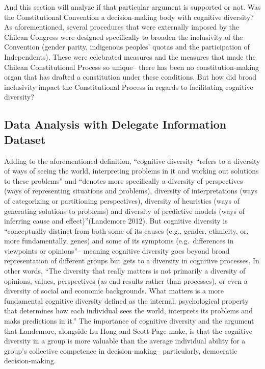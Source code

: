 \documentclass[
]{article}
\begin{document}
And this section will analyze if that particular argument is supported
or not. Was the Constitutional Convention a decision-making body with
cognitive diversity? As aforementioned, several procedures that were
externally imposed by the Chilean Congress were designed specifically to
broaden the inclusivity of the Convention (gender parity, indigenous
peoples' quotas and the participation of Independents). These were
celebrated measures and the measures that made the Chilean
Constitutional Process so unique-- there has been no constitution-making
organ that has drafted a constitution under these conditions. But how
did broad inclusivity impact the Constitutional Process in regards to
facilitating cognitive diversity?

\hypertarget{data-analysis-with-delegate-information-dataset}{%
\subsection{Data Analysis with Delegate Information
Dataset}\label{data-analysis-with-delegate-information-dataset}}

Adding to the aforementioned definition, ``cognitive diversity ``refers
to a diversity of ways of seeing the world, interpreting problems in it
and working out solutions to these problems'' and ``denotes more
specifically a diversity of perspectives (ways of representing
situations and problems), diversity of interpretations (ways of
categorizing or partitioning perspectives), diversity of heuristics
(ways of generating solutions to problems) and diversity of predictive
models (ways of inferring cause and effect)''(Landemore 2012). But
cognitive diversity is ``conceptually distinct from both some of its
causes (e.g., gender, ethnicity, or, more fundamentally, genes) and some
of its symptoms (e.g.~differences in viewpoints or opinions''-- meaning
cognitive diversity goes beyond broad representation of different groups
but gets to a diversity in cognitive processes. In other words, ``The
diversity that really matters is not primarily a diversity of opinions,
values, perspectives (as end-results rather than processes), or even a
diversity of social and economic backgrounds. What matters is a more
fundamental cognitive diversity defined as the internal, psychological
property that determines how each individual sees the world, interprets
its problems and maks predictions in it.'' The importance of cognitive
diversity and the argument that Landemore, alongside Lu Hong and Scott
Page make, is that the cognitive diversity in a group is more valuable
than the average individual ability for a group's collective competence
in decision-making-- particularly, democratic decision-making.
\end{document}

